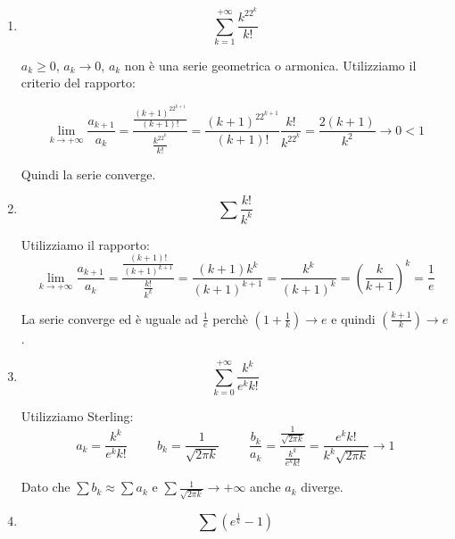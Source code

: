 \begin{exercise}
\begin{enumerate}
    \item\begin{equation*}\sum^{+\infty}_{k=1}\frac{k^22^k}{k!}\end{equation*}
    
    $a_k\geq0$, $a_k\to0$, $a_k$ non è una serie geometrica o armonica. Utilizziamo il criterio del rapporto:
    
    \begin{equation*}
         \lim_{k\to+\infty}\frac{a_{k+1}}{a_k}=\frac{\frac{(k+1)^22^{k+1}}{(k+1)!}}{\frac{k^22^k}{k!}}=\frac{(k+1)^22^{k+1}}{(k+1)!}\frac{k!}{k^22^k}=\frac{2(k+1)}{k^2}\to0<1
    \end{equation*}
    
    Quindi la serie converge.
    
    \item \begin{equation*}\sum\frac{k!}{k^k}\end{equation*}
    
    Utilizziamo il rapporto:
    \begin{equation*}
        \lim_{k\to+\infty}\frac{a_{k+1}}{a_k}=\frac{\frac{(k+1)!}{(k+1)^{k+1}}}{\frac{k!}{k^k}}=\frac{(k+1)k^k}{(k+1)^{k+1}}=\frac{k^k}{(k+1)^k}=(\frac{k}{k+1})^k=\frac{1}{e}
    \end{equation*}
    
    La serie converge ed è uguale ad $\frac{1}{e}$ perchè $(1+\frac{1}{k})\to e$ e quindi $(\frac{k+1}{k})\to e$.
    
    \item \begin{equation*}\sum^{+\infty}_{k=0}\frac{k^k}{e^kk!}\end{equation*}
    
    Utilizziamo Sterling:
    \begin{equation*}
        a_k=\frac{k^k}{e^kk!}\hspace{1cm}b_k=\frac{1}{\sqrt{2\pi k}}\hspace{1cm}\frac{b_k}{a_k}=\frac{\frac{1}{\sqrt{2\pi k}}}{\frac{k^k}{e^kk!}}=\frac{e^kk!}{k^k\sqrt{2\pi k}}\to1
    \end{equation*}
    
    Dato che $\sum b_k\approx \sum a_k$ e $\sum\frac{1}{\sqrt{2\pi k}}\to+\infty$ anche $a_k$ diverge.
    
    \item \begin{equation*}\sum(e^{\frac{1}{k}}-1)\end{equation*}
    

\end{enumerate}
\end{exercise}
